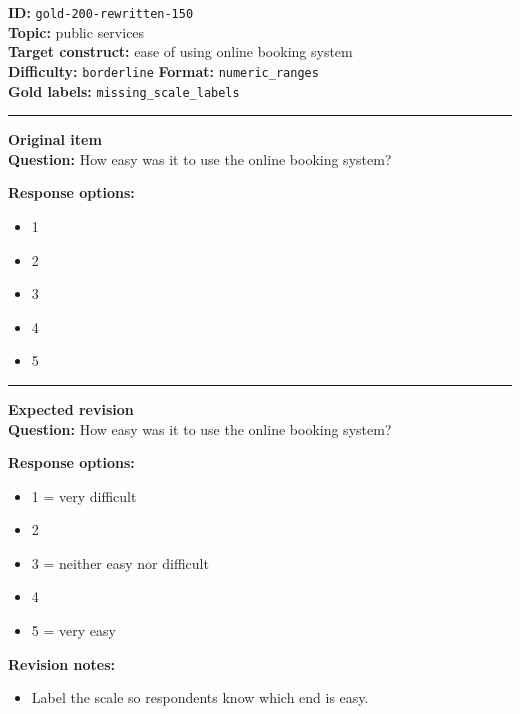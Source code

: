 \documentclass[10pt,a4paper]{article}
\newcommand{\sectionline}{\vspace{0.15em}\hrule\vspace{0.35em}}
\begin{document}
\begin{tcolorbox}[colframe=FlawRed,colback=white,colbacktitle=FlawRed!9,coltitle=black,title={Item 150\hfill Flawed item}]
\textbf{ID:} \texttt{gold-200-rewritten-150}\\
\textbf{Topic:} public services\\
\textbf{Target construct:} ease of using online booking system\\
\textbf{Difficulty:} \texttt{borderline} \quad \textbf{Format:} \texttt{numeric\_ranges}\\
\textbf{Gold labels:} \texttt{missing\_scale\_labels}\\
\sectionline
\textbf{Original item}\\
\textbf{Question:} How easy was it to use the online booking system?
\par\textbf{Response options:}
\begin{itemize}
\item 1
\item 2
\item 3
\item 4
\item 5
\end{itemize}
\sectionline
\textbf{Expected revision}\\
\textbf{Question:} How easy was it to use the online booking system?
\par\textbf{Response options:}
\begin{itemize}
\item 1 = very difficult
\item 2
\item 3 = neither easy nor difficult
\item 4
\item 5 = very easy
\end{itemize}
\par\textbf{Revision notes:}
\begin{itemize}
\item Label the scale so respondents know which end is easy.
\end{itemize}
\end{tcolorbox}
\end{document}
